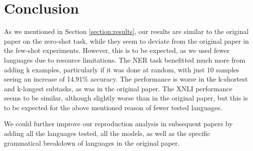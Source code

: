 \documentclass[times, utf8, seminar, english]{fer}
\begin{document}
\section{Conclusion}
As we mentioned in Section \ref{section:results}, our results are similar to the original paper on the zero-shot task, while they seem to deviate from the original paper in the few-shot experiments. However, this is to be expected, as we used fewer languages due to resource limitations. The NER task benefitted much more from adding k examples, particularly if it was done at random, with just 10 samples seeing an increase of 14.91\% accuracy. The performance is worse in the k-shortest and k-longest subtasks, as was in the original paper. The XNLI performance seems to be similar, although slightly worse than in the original paper, but this is to be expected for the above mentioned reason of fewer tested languages. 
\par
We could further improve our reproduction analysis in subsequent papers by adding all the languages tested, all the models, as well as the specific grammatical breakdown of languages in the original paper.




\end{document}
